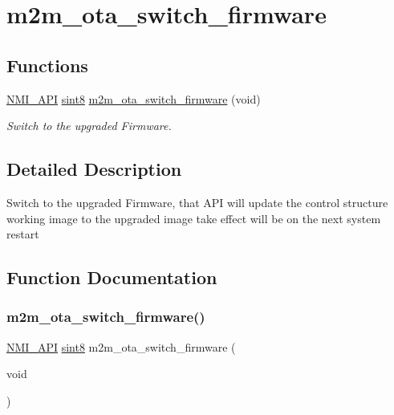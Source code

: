 \hypertarget{group__OtaSwitchFirmware}{}\section{m2m\+\_\+ota\+\_\+switch\+\_\+firmware}
\label{group__OtaSwitchFirmware}
\subsection*{Functions}
\begin{DoxyCompactItemize}
\item 
\hyperlink{group__BSPDefine_gaecc0323d771e41ef81a76b5f12783e22}{N\+M\+I\+\_\+\+A\+PI} \hyperlink{group__DataT_gae35f10ffd0ac8dd2bc3e794da9bdfbc7}{sint8} \hyperlink{group__OtaSwitchFirmware_ga464a45a53473152d5a78c578ae0edd8a}{m2m\+\_\+ota\+\_\+switch\+\_\+firmware} (void)
\begin{DoxyCompactList}\small\item\em Switch to the upgraded Firmware. \end{DoxyCompactList}\end{DoxyCompactItemize}


\subsection{Detailed Description}
Switch to the upgraded Firmware, that A\+PI will update the control structure working image to the upgraded image take effect will be on the next system restart 

\subsection{Function Documentation}
\mbox{\label{group__OtaSwitchFirmware_ga464a45a53473152d5a78c578ae0edd8a}} 
\subsubsection{\texorpdfstring{m2m\+\_\+ota\+\_\+switch\+\_\+firmware()}{m2m\_ota\_switch\_firmware()}}
{\footnotesize\ttfamily \hyperlink{group__BSPDefine_gaecc0323d771e41ef81a76b5f12783e22}{N\+M\+I\+\_\+\+A\+PI} \hyperlink{group__DataT_gae35f10ffd0ac8dd2bc3e794da9bdfbc7}{sint8} m2m\+\_\+ota\+\_\+switch\+\_\+firmware (\begin{DoxyParamCaption}\item[{void}]{ }\end{DoxyParamCaption})}



